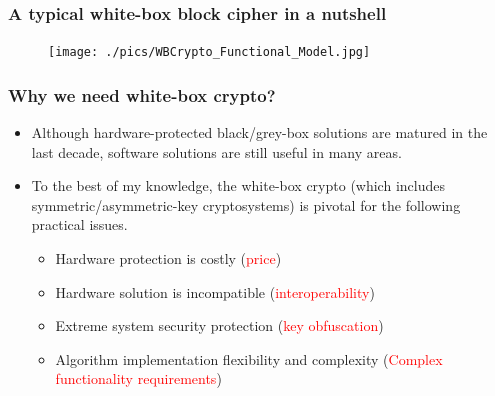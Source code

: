 \documentclass{beamer}
\begin{document}
\frame
{
\frametitle{A typical white-box block cipher in a nutshell}
\begin{figure}[htbp]
\centering
  \texttt{[image: ./pics/WBCrypto\_Functional\_Model.jpg]}
\end{figure}

}


\frame
{
\frametitle{Why we need white-box crypto?}
\begin{itemize}
\setlength{\itemsep}{12pt}
\item Although hardware-protected black/grey-box solutions are matured in the last decade, software solutions are still useful in many areas.

\item To the best of my knowledge, the white-box crypto (which includes symmetric/asymmetric-key cryptosystems) is pivotal for the following practical issues.
\begin{itemize}
\setlength{\itemsep}{12pt}
\item Hardware protection is costly (\textcolor{red}{price})
\item Hardware solution is incompatible (\textcolor{red}{interoperability})
\item Extreme system security protection (\textcolor{red}{key obfuscation})
\item Algorithm implementation flexibility and complexity (\textcolor{red}{Complex functionality requirements})
\end{itemize}
\end{itemize}

}
\end{document}
